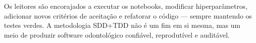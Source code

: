 Os leitores são encorajados a executar os notebooks, modificar
hiperparâmetros, adicionar novos critérios de aceitação e refatorar
o código — sempre mantendo os testes verdes. A metodologia SDD+TDD
não é um fim em si mesma, mas um meio de produzir software odontológico
confiável, reprodutível e auditável.
